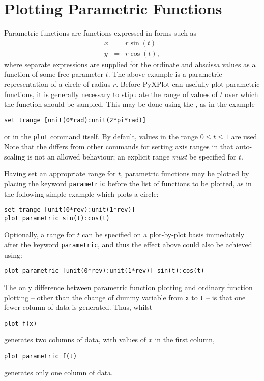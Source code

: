 \section{Plotting Parametric Functions}
\label{sec:parametric_plotting}

Parametric functions are functions expressed in forms such as
\begin{eqnarray*}
x & = & r \sin(t)  \\
y & = & r \cos(t) ,
\end{eqnarray*}
where separate expressions are supplied for the ordinate and abscissa values as
a function of some free parameter $t$. The above example is a parametric
representation of a circle of radius $r$. Before PyXPlot can usefully plot
parametric functions, it is generally necessary to stipulate the range of
values of $t$ over which the function should be sampled. This may be done using
the , as in the example
\begin{verbatim}
set trange [unit(0*rad):unit(2*pi*rad)]
\end{verbatim}
or in the {\tt plot} command itself. By default, values in the range $0\leq
t\leq1$ are used. Note that the  differs from other
commands for setting axis ranges in that auto-scaling is not an allowed
behaviour; an explicit range {\it must} be specified for $t$.

Having set an appropriate range for $t$, parametric functions may be plotted by
placing the keyword {\tt parametric} before the list of functions to be
plotted, as in the following simple example which plots a circle:
\begin{verbatim}
set trange [unit(0*rev):unit(1*rev)]
plot parametric sin(t):cos(t)
\end{verbatim}
Optionally, a range for $t$ can be specified on a plot-by-plot basis
immediately after the keyword {\tt parametric}, and thus the effect above could
also be achieved using:
\begin{verbatim}
plot parametric [unit(0*rev):unit(1*rev)] sin(t):cos(t)
\end{verbatim}
The only difference between parametric function plotting and ordinary function
plotting -- other than the change of dummy variable from {\tt x} to {\tt t} --
is that one fewer column of data is generated. Thus, whilst
\begin{verbatim}
plot f(x)
\end{verbatim}
generates two columns of data, with values of $x$ in the first column,
\begin{verbatim}
plot parametric f(t)
\end{verbatim}
generates only one column of data.

